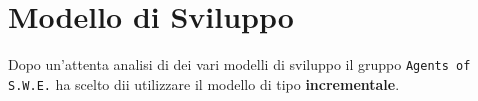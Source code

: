 \section{Modello di Sviluppo}

Dopo un'attenta analisi di dei vari modelli di sviluppo il gruppo \texttt{Agents of S.W.E.} ha scelto dii utilizzare il modello di tipo \textbf{incrementale}.